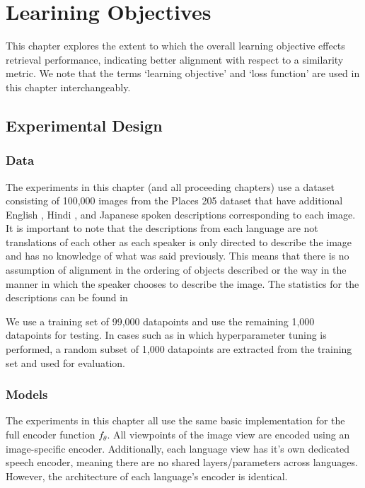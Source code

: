 \chapter{Learining Objectives}
\label{chapter:objective_exploration}

This chapter explores the extent to which the overall learning objective effects retrieval performance, indicating better alignment with respect to a similarity metric.
We note that the terms `learning objective' and `loss function' are used in this chapter interchangeably.




\section{Experimental Design}
\label{chapter:obj_exp|section:exp_design}
\subsection{Data}
The experiments in this chapter (and all proceeding chapters) use a dataset consisting of 100,000 images from the Places 205 dataset \citeme{} that have additional English \citeme{}, Hindi \citeme{}, and Japanese \citeme{} spoken descriptions corresponding to each image.
It is important to note that the descriptions from each language are not translations of each other as each speaker is only directed to describe the image and has no knowledge of what was said previously. 
This means that there is no assumption of alignment in the ordering of objects described or the way in the manner in which the speaker chooses to describe the image.
The statistics for the descriptions can be found in 

We use a training set of 99,000 datapoints and use the remaining 1,000 datapoints for testing. 
In cases such as \dftwrds{} in which hyperparameter tuning is performed, a random subset of 1,000 datapoints are extracted from the training set and used for evaluation.
\subsection{Models}
\label{section:obj_exp_models}
The experiments in this chapter all use the same basic implementation for the full encoder function $f_\theta$.
All viewpoints of the image view are encoded using an image-specific encoder.
Additionally, each language view has it's own dedicated speech encoder, meaning there are no shared layers/parameters across languages.
However, the architecture of each language's encoder is identical.

